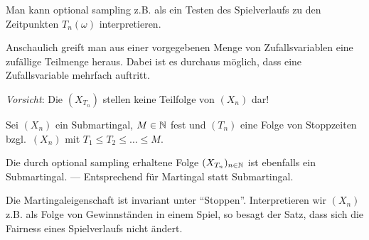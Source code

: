 Man kann optional sampling z.B. als ein Testen des Spielverlaufs zu den
Zeitpunkten $T_{n}(\omega )$ interpretieren.

Anschaulich greift man aus einer vorgegebenen Menge von Zufallsvariablen eine
zufällige Teilmenge heraus. Dabei ist es durchaus möglich, dass eine
Zufallsvariable mehrfach auftritt.

\textit{Vorsicht}: Die $(X_{T_n})$ stellen keine Teilfolge von $(X_n)$ dar!

\begin{prop}
\label{prop:11.4}
Sei $(X_{n})$ ein Submartingal, $M\in \mathbb{N}$ fest und $(T_{n})$
eine Folge von Stoppzeiten bzgl.\ $(X_{n})$ mit $T_{1}\leq T_{2} \leq \ldots
\leq M$.

Die durch optional sampling erhaltene Folge $(X_{T_{n}})_{n\in \mathbb{N}}$
ist ebenfalls ein Submartingal. --- Entsprechend für Martingal statt
Submartingal.\fishhere
\end{prop}

Die Martingaleigenschaft ist invariant unter ``Stoppen''. Interpretieren wir
$(X_n)$ z.B. als Folge von Gewinnständen in einem Spiel, so besagt der Satz,
dass sich die Fairness eines Spielverlaufs nicht ändert.

